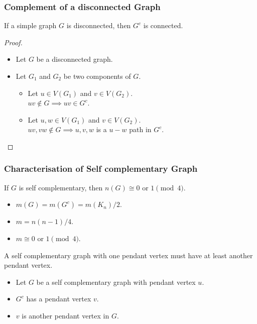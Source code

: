 \documentclass{beamer}
\begin{document}
\begin{frame}
\begin{figure}
{
}
\end{figure}
\end{frame}

\begin{frame}
\frametitle{Complement of a disconnected Graph} %
\begin{theorem}
	If a simple graph $G$ is disconnected, then $G^c$ is connected.
\end{theorem}
\begin{proof}
\begin{itemize}
	\item Let $G$ be a disconnected graph. 
	\item Let $G_1$ and $G_2$ be two components of $G$.
	\begin{itemize}
		\item Let $u \in V(G_1)$ and $v \in V(G_2)$.\\
		$uv \notin G \implies uv \in G^c$.
	\item Let $u,w \in V(G_1)$ and $v \in V(G_2)$.\\
		$uv,vw \notin G \implies u,v,w$ is a $u-w$ path in $G^c$.
	\end{itemize}
\end{itemize}
\end{proof}
\end{frame}

\begin{frame}
\frametitle{Characterisation of Self complementary Graph}
If $G$ is self complementary, then $n(G) \cong 0 \text{ or } 1 \pmod{4}$.
\begin{itemize}
	\item $m(G) = m(G^c) = m(K_n)/2$.
	\item $m = n(n-1)/4$.
	\item $m \cong 0 \text{ or } 1 \pmod{4}$.
\end{itemize}
\vfill
A self complementary graph with one pendant vertex must have at least another pendant vertex.
\begin{itemize}
	\item Let $G$ be a self complementary graph with pendant vertex $u$.
	\item $G^c$ has a pendant vertex $v$.
	\item $v$ is another pendant vertex in $G$.
\end{itemize}
\end{frame}
\end{document}
